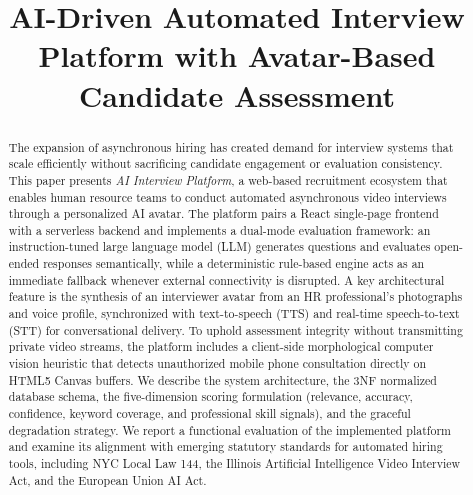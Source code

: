 \documentclass[conference]{IEEEtran}
\begin{document}
\title{AI-Driven Automated Interview Platform with Avatar-Based Candidate Assessment}

\author{
\and
{}
}

\maketitle

\begin{abstract}
The expansion of asynchronous hiring has created demand for interview systems that scale efficiently without sacrificing candidate engagement or evaluation consistency. This paper presents \textit{AI Interview Platform}, a web-based recruitment ecosystem that enables human resource teams to conduct automated asynchronous video interviews through a personalized AI avatar. The platform pairs a React single-page frontend with a serverless backend and implements a dual-mode evaluation framework: an instruction-tuned large language model (LLM) generates questions and evaluates open-ended responses semantically, while a deterministic rule-based engine acts as an immediate fallback whenever external connectivity is disrupted. A key architectural feature is the synthesis of an interviewer avatar from an HR professional's photographs and voice profile, synchronized with text-to-speech (TTS) and real-time speech-to-text (STT) for conversational delivery. To uphold assessment integrity without transmitting private video streams, the platform includes a client-side morphological computer vision heuristic that detects unauthorized mobile phone consultation directly on HTML5 Canvas buffers. We describe the system architecture, the 3NF normalized database schema, the five-dimension scoring formulation (relevance, accuracy, confidence, keyword coverage, and professional skill signals), and the graceful degradation strategy. We report a functional evaluation of the implemented platform and examine its alignment with emerging statutory standards for automated hiring tools, including NYC Local Law 144, the Illinois Artificial Intelligence Video Interview Act, and the European Union AI Act.
\end{abstract}
\end{document}
